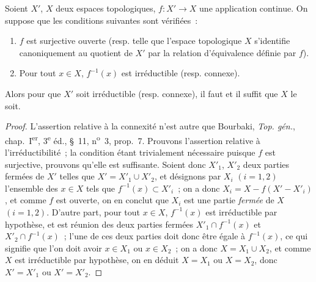 \begin{lemma}[4.4.2]
\label{IV.2.4.4.2-fr}
Soient $X'$, $X$ deux espaces topologiques, $f:X'\to X$ une application
continue. On suppose que les conditions suivantes sont vérifiées~:
\begin{enumerate}
\item[(i)] $f$ est surjective ouverte (resp. telle que l'espace topologique
$X$ s'identifie canoniquement au quotient de $X'$ par la relation d'équivalence
définie par $f$).


\item[(ii)] Pour tout $x\in X$, $f^{-1}(x)$ est irréductible (resp. connexe).
\end{enumerate}
Alors pour que $X'$ soit irréductible (resp. connexe), il faut et il suffit
que $X$ le soit.
\end{lemma}

\begin{proof}
L'assertion relative à la connexité n'est autre que Bourbaki,
\emph{Top. gén.}, chap.~I\textsuperscript{er}, 3\textsuperscript{e} éd.,
\S~11, n\textsuperscript{o}~3, prop.~7. Prouvons l'assertion relative à
l'irréductibilité~; la condition étant trivialement nécessaire puisque $f$
est surjective, prouvons qu'elle est suffisante. Soient donc $X'_1$, $X'_2$
deux parties fermées de $X'$ telles que $X'=X'_1\cup X'_2$, et désignons par
$X_i$ $(i=1,2)$ l'ensemble des $x\in X$ tels que $f^{-1}(x)\subset X'_i$~; on
a donc $X_i=X-f(X'-X'_i)$, et comme $f$ est ouverte, on en conclut que $X_i$
est une partie \emph{fermée} de $X$ $(i=1,2)$. D'autre part, pour tout
$x\in X$, $f^{-1}(x)$ est irréductible par hypothèse, et est réunion des deux
parties fermées $X'_1\cap f^{-1}(x)$ et $X'_2\cap f^{-1}(x)$~; l'une de ces
deux parties doit donc être égale à $f^{-1}(x)$, ce qui signifie que l'on doit
avoir $x\in X_1$ ou $x\in X_2$~; on a donc $X=X_1\cup X_2$, et comme $X$ est
irréductible par hypothèse, on en déduit $X=X_1$ ou $X=X_2$, donc
$X'=X'_1$ ou $X'=X'_2$.
\end{proof}

